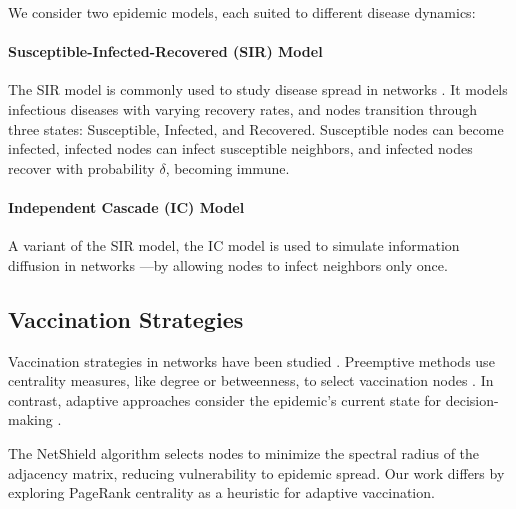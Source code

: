 \documentclass[9pt]{extarticle}
\begin{document}
We consider two epidemic models, each suited to different disease dynamics:

\paragraph{Susceptible-Infected-Recovered (SIR) Model \cite{kermack1927contribution}}

The SIR model is commonly used to study disease spread in networks \cite{anderson1991infectious, hethcote2000mathematics, shah2011rumors}. It models infectious diseases with varying recovery rates, and nodes transition through three states: Susceptible, Infected, and Recovered. Susceptible nodes can become infected, infected nodes can infect susceptible neighbors, and infected nodes recover with probability $\delta$, becoming immune.

\paragraph{Independent Cascade (IC) Model \cite{kempe2003maximizing}}

A variant of the SIR model, the IC model is used to simulate information diffusion in networks \cite{kempe2003maximizing}—by allowing nodes to infect neighbors only once.


\subsection{Vaccination Strategies}
\vspace{-0.1cm}

Vaccination strategies in networks have been studied \cite{cohen2003efficient,holme2002attack}. Preemptive methods use centrality measures, like degree or betweenness, to select vaccination nodes \cite{kitsak2010identification}. In contrast, adaptive approaches consider the epidemic's current state for decision-making \cite{pastor2015epidemic}.

The NetShield algorithm \cite{tong2010vulnerability} selects nodes to minimize the spectral radius of the adjacency matrix, reducing vulnerability to epidemic spread. Our work differs by exploring PageRank centrality as a heuristic for adaptive vaccination.
\end{document}
